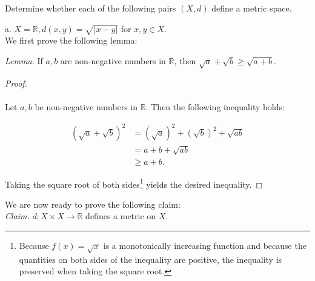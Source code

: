 Determine whether each of the following pairs $(X, d)$ define a metric space.

a.  $X = \mathbb{R}, d(x, y) = \sqrt{|x - y|}$ for $x, y \in X$. \ \\

    We first prove the following lemma:

    \emph{Lemma.} If $a, b$ are non-negative numbers in  $\mathbb{R}$, then $\sqrt{a} + \sqrt{b} \ge \sqrt{a + b}$.

    \begin{proof}\ \\\\
        Let $a,b$ be non-negative numbers in $\mathbb{R}$. Then the following inequality holds:

        \begin{align*}
            (\sqrt{a} + \sqrt{b})^2 &= (\sqrt{a})^2 + (\sqrt{b})^2 + \sqrt{ab} \\
                                    &= a + b + \sqrt{ab} \\
                                    &\ge a + b.
        \end{align*}

        Taking the square root of both sides\footnote{
            Because $f(x) = \sqrt{x}$ is a monotonically increasing function and because the quantities on both sides of
            the inequality are positive, the inequality is preserved when taking the square root.
        } yields the desired inequality.
    \end{proof}

    We are now ready to prove the following claim:\ \\

    \emph{Claim.} $d: X \times X \to \mathbb{R}$ defines a metric on $X$.

